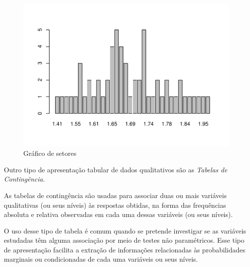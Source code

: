 \documentclass[
]{book}
\begin{document}
\begin{figure}
\centering
\includegraphics{apostila_files/figure-latex/unnamed-chunk-42-1.pdf}
\caption{\label{fig:unnamed-chunk-42}Gráfico de setores}
\end{figure}

\hfill\break

Outro tipo de apresentação tabular de dados qualitativos são as \emph{Tabelas de Contingência}.

\hfill\break

As tabelas de contingência são usadas para associar duas ou mais variáveis qualitativas (ou seus níveis) às respostas obtidas, na forma das frequências absoluta e relativa observadas em cada uma dessas variáveis (ou seus níveis).

\hfill\break

O uso desse tipo de tabela é comum quando se pretende investigar se as variáveis estudadas têm alguma associação por meio de testes não paramétricos. Esse tipo de apresentação facilita a extração de informações relacionadas às probabilidades marginais ou condicionadas de cada uma variáveis ou seus níveis.

\hfill\break
\end{document}
